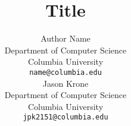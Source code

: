 \documentclass{article}
\title{Title}
\author{
Author Name \\
Department of Computer Science\\
Columbia University \\
\texttt{name@columbia.edu} \\
\And
Jason Krone \\
Department of Computer Science\\
Columbia University \\
\texttt{jpk2151@columbia.edu} \\
}
\begin{document}
\maketitle












\clearpage

\nocite{*}
\printbibliography
\end{document}

